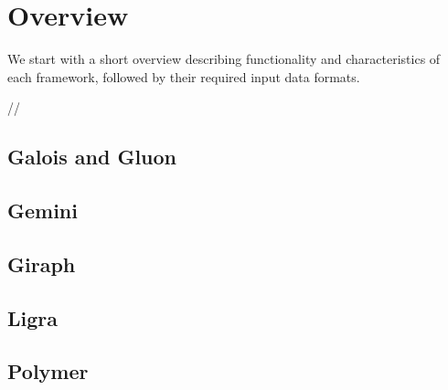 
\section{Overview}
We start with a short overview describing functionality and characteristics of each framework, followed by their required input data formats.

//
\subsection{Galois and Gluon}


\subsection{Gemini}


\subsection{Giraph}


\subsection{Ligra}


\subsection{Polymer}





